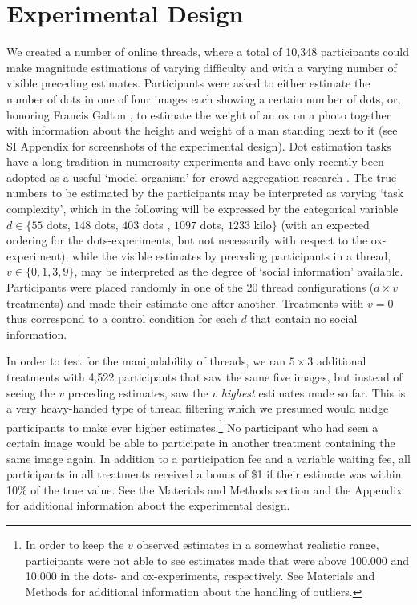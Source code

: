 \documentclass[10pt,a4paper,twocolumn,lineno]{article}
\begin{document}
\section{Experimental Design}
We created a number of online threads, where a total of 10,348 participants could make magnitude estimations of varying difficulty and with a varying number of visible preceding estimates. Participants were asked to either estimate the number of dots in one of four images each showing a certain number of dots, or, honoring Francis Galton \cite{galton1907vox}, to estimate the weight of an ox on a photo together with information about the height and weight of a man standing next to it (see SI Appendix for screenshots of the experimental design). Dot estimation tasks have a long tradition in numerosity experiments \cite{minturn1951effect, indow1977scaling, krueger1982single} and have only recently been adopted as a useful ‘model organism’ for crowd aggregation research \cite{horton2010dot, ugander2015wisdom}. The true numbers to be estimated by the participants may be interpreted as varying ‘task complexity’, which in the following will be expressed by the categorical variable $d \in \{55$ dots, $148$ dots, $403$ dots , $1097$ dots, $1233$ kilo$\}$ (with an expected ordering for the dots-experiments, but not necessarily with respect to the ox-experiment), while the visible estimates by preceding participants in a thread, $v \in \{0,1,3,9\}$, may be interpreted as the degree of ‘social information’ available. Participants were placed randomly in one of the 20 thread configurations ($d \times v$ treatments) and made their estimate one after another. Treatments with $v=0$ thus correspond to a control condition for each $d$ that contain no social information. 

In order to test for the manipulability of threads, we ran $5 \times 3$ additional treatments with 4,522 participants that saw the same five images, but instead of seeing the $v$ preceding estimates, saw the $v$ \textit{highest} estimates made so far. This is a very heavy-handed type of thread filtering which we presumed would nudge participants to make ever higher estimates.\footnote{In order to keep the $v$ observed estimates in a somewhat realistic range, participants were not able to see estimates made that were above 100.000 and 10.000 in the  dots- and ox-experiments, respectively. See Materials and Methods for additional information about the handling of outliers.} No participant who had seen a certain image would be able to participate in another treatment containing the same image again. In addition to a participation fee and a variable waiting fee, all participants in all treatments received a bonus of \$1 if their estimate was within 10\% of the true value. See the Materials and Methods section and the Appendix for additional information about the experimental design.
\end{document}
